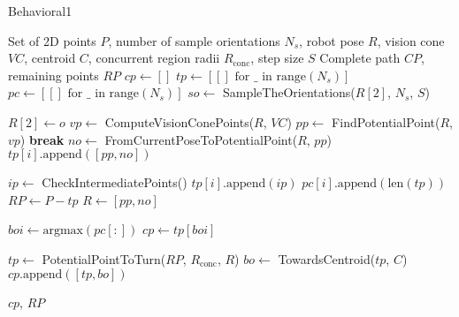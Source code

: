 \begin{algorithm}[H]
    \caption{Behavioral1}
    \label{alg:behavioral1}
    \begin{algorithmic}[1]
    \Require Set of 2D points $P$, number of sample orientations $N_s$, robot pose $R$, vision cone $VC$, centroid $C$, concurrent region radii $R_{\text{conc}}$, step size $S$
    \Ensure Complete path $CP$, remaining points $RP$
    \State $cp \leftarrow []$
    \State $tp \leftarrow [[] \text{ for } \_ \text{ in range}(N_s)]$
    \State $pc \leftarrow [[] \text{ for } \_ \text{ in range}(N_s)]$
    \State $so \leftarrow$ SampleTheOrientations($R[2]$, $N_s$, $S$)
    
        \State $R[2] \leftarrow o$
            \State $vp \leftarrow$ ComputeVisionConePoints($R$, $VC$)
            \State $pp \leftarrow$ FindPotentialPoint($R$, $vp$)
                \State \textbf{break}
            \EndIf
            \State $no \leftarrow$ FromCurrentPoseToPotentialPoint($R$, $pp$)
            \State $tp[i].\text{append}([pp, no])$
            
            \State $ip \leftarrow$ CheckIntermediatePoints()
            \State $tp[i].\text{append}(ip)$
            \State $pc[i].\text{append}(\text{len}(tp))$
            \State $RP \leftarrow P - tp$
            \State $R \leftarrow [pp, no]$
        \EndWhile
    \EndFor
    
    \State $boi \leftarrow \text{argmax}(pc[:])$
    \State $cp \leftarrow tp[boi]$
    
    \State $tp \leftarrow$ PotentialPointToTurn($RP$, $R_{\text{conc}}$, $R$)
    \State $bo \leftarrow$ TowardsCentroid($tp$, $C$)
    \State $cp.\text{append}([tp, bo])$
    
    \State \Return $cp$, $RP$
    \end{algorithmic}
    \end{algorithm}
    
